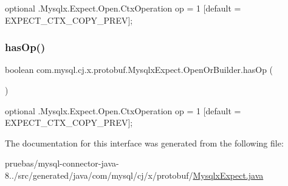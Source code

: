 {\ttfamily optional .Mysqlx.\+Expect.\+Open.\+Ctx\+Operation op = 1 \mbox{[}default = E\+X\+P\+E\+C\+T\+\_\+\+C\+T\+X\+\_\+\+C\+O\+P\+Y\+\_\+\+P\+R\+EV\mbox{]};} \mbox{\label{interfacecom_1_1mysql_1_1cj_1_1x_1_1protobuf_1_1_mysqlx_expect_1_1_open_or_builder_a173f6467d5e57ac44c7606a9895c3fe1}} 
\subsubsection{\texorpdfstring{has\+Op()}{hasOp()}}
{\footnotesize\ttfamily boolean com.\+mysql.\+cj.\+x.\+protobuf.\+Mysqlx\+Expect.\+Open\+Or\+Builder.\+has\+Op (\begin{DoxyParamCaption}{ }\end{DoxyParamCaption})}

{\ttfamily optional .Mysqlx.\+Expect.\+Open.\+Ctx\+Operation op = 1 \mbox{[}default = E\+X\+P\+E\+C\+T\+\_\+\+C\+T\+X\+\_\+\+C\+O\+P\+Y\+\_\+\+P\+R\+EV\mbox{]};} 

The documentation for this interface was generated from the following file\+:\begin{DoxyCompactItemize}
\item 
pruebas/mysql-\/connector-\/java-\/8../src/generated/java/com/mysql/cj/x/protobuf/\mbox{\hyperlink{_mysqlx_expect_8java}{Mysqlx\+Expect.\+java}}\end{DoxyCompactItemize}
